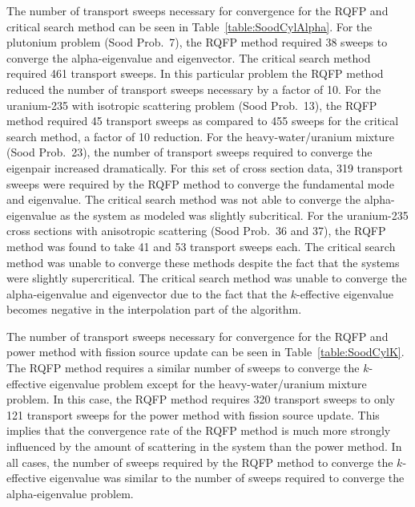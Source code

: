 The number of transport sweeps necessary for convergence for the RQFP and critical search method can be seen in Table~\ref{table:SoodCylAlpha}. For the plutonium problem (Sood Prob.~7), the RQFP method required 38 sweeps to converge the alpha-eigenvalue and eigenvector. The critical search method required 461 transport sweeps. In this particular problem the RQFP method reduced the number of transport sweeps necessary by a factor of 10. For the uranium-235 with isotropic scattering problem (Sood Prob.~13), the RQFP method required 45 transport sweeps as compared to 455 sweeps for the critical search method, a factor of 10 reduction. For the heavy-water/uranium mixture (Sood Prob.~23), the number of transport sweeps required to converge the eigenpair increased dramatically. For this set of cross section data, 319 transport sweeps were required by the RQFP method to converge the fundamental mode and eigenvalue. The critical search method was not able to converge the alpha-eigenvalue as the system as modeled was slightly subcritical. For the uranium-235 cross sections with anisotropic scattering (Sood Prob.~36 and 37), the RQFP method was found to take 41 and 53 transport sweeps each. The critical search method was unable to converge these methods despite the fact that the systems were slightly supercritical. The critical search method was unable to converge the alpha-eigenvalue and eigenvector due to the fact that the $k$-effective eigenvalue becomes negative in the interpolation part of the algorithm.

The number of transport sweeps necessary for convergence for the RQFP and power method with fission source update can be seen in Table~\ref{table:SoodCylK}. The RQFP method requires a similar number of sweeps to converge the $k$-effective eigenvalue problem except for the heavy-water/uranium mixture problem. In this case, the RQFP method requires 320 transport sweeps to only 121 transport sweeps for the power method with fission source update. This implies that the convergence rate of the RQFP method is much more strongly influenced by the amount of scattering in the system than the power method. In all cases, the number of sweeps required by the RQFP method to converge the $k$-effective eigenvalue was similar to the number of sweeps required to converge the alpha-eigenvalue problem. 

